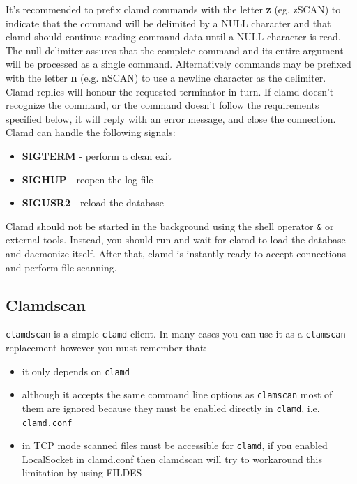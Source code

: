 \documentclass[a4paper,titlepage,12pt]{article}
\begin{document}
    It's recommended to prefix clamd commands with the letter \textbf{z}
    (eg. zSCAN) to indicate that the command will be delimited by a NULL
    character and that clamd should continue reading command data until a NULL
    character is read. The null delimiter assures that the complete command
    and its entire argument will be processed as a single command. Alternatively
    commands may be prefixed with the letter \textbf{n} (e.g. nSCAN) to use
    a newline character as the delimiter. Clamd replies will honour the
    requested terminator in turn. If clamd doesn't recognize the command, or
    the command doesn't follow the requirements specified below, it will reply
    with an error message, and close the connection.
    \noindent
    Clamd can handle the following signals:
    \begin{itemize}
	\item \textbf{SIGTERM} - perform a clean exit
	\item \textbf{SIGHUP} - reopen the log file
	\item \textbf{SIGUSR2} - reload the database
    \end{itemize}
    Clamd should not be started in the background using the shell operator
    \verb+&+ or external tools. Instead, you should run and wait for clamd
    to load the database and daemonize itself. After that, clamd is instantly
    ready to accept connections and perform file scanning.

    \subsection{Clam\textbf{d}scan}
    \verb+clamdscan+ is a simple \verb+clamd+ client. In many cases you can
    use it as a \verb+clamscan+ replacement however you must remember that:
    \begin{itemize}
	\item it only depends on \verb+clamd+
	\item although it accepts the same command line options as
	      \verb+clamscan+ most of them are ignored because they must be
	      enabled directly in \verb+clamd+, i.e. \verb+clamd.conf+
	\item in TCP mode scanned files must be accessible for \verb+clamd+,
	      if you enabled LocalSocket in clamd.conf then clamdscan will
	      try to workaround this limitation by using FILDES
    \end{itemize}
\end{document}
